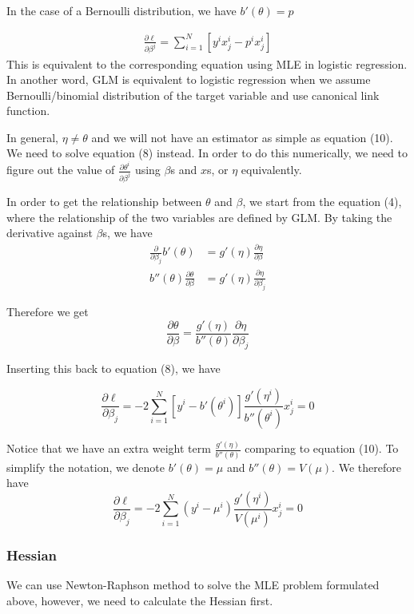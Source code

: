 \documentclass[12pt, oneside]{article}
\begin{document}
In the case of a Bernoulli distribution, we have $b'(\theta)=p$

\begin{align*}
\frac{\partial \ell}{\partial \beta^j}=\sum\limits_{i=1}^N[y^ix^i_j-p^ix^i_j]
\end{align*}
This is equivalent to the corresponding equation using MLE in logistic regression. In another word, GLM is equivalent to logistic regression when we assume Bernoulli/binomial distribution of the target variable and use canonical link function.

In general, $\eta\neq\theta$ and we will not have an estimator as simple as equation (10). We need to solve equation (8) instead. In order to do this numerically, we need to figure out the value of $\frac{\partial \theta^i}{\partial\beta^j}$ using $\beta$s and $x$s, or $\eta$ equivalently. 

In order to get the relationship between $\theta$ and $\beta$, we start from the equation (4), where the relationship of the two variables are defined by GLM. By taking the derivative against $\beta$s, we have 
\begin{align}
\frac{\partial}{\partial\beta_j}b'(\theta)&=g'(\eta)\frac{\partial \eta}{\partial \beta}\\
b''(\theta)\frac{\partial \theta}{\partial\beta}&=g'(\eta)\frac{\partial \eta}{\partial \beta_j}
\end{align}

Therefore we get 
\begin{equation}
\frac{\partial \theta}{\partial\beta}=\frac{g'(\eta)}{b''(\theta)}\frac{\partial \eta}{\partial \beta_j}
\end{equation}

Inserting this back to equation (8), we have 

\begin{equation}
\frac{\partial \ell}{\partial \beta_j}=-2\sum_{i=1}^{N}\left[y^i-b'(\theta^i)\right]\frac{g'(\eta^i)}{b''(\theta^i)}x^i_j=0
\end{equation}

Notice that we have an extra weight term $\frac{g'(\eta)}{b''(\theta)}$ comparing to equation (10). To simplify the notation, we denote $b'(\theta)=\mu$ and $b''(\theta)=V(\mu)$. We therefore have 
\begin{equation}
\frac{\partial \ell}{\partial \beta_j}=-2\sum_{i=1}^{N}(y^i-\mu^i)\frac{g'(\eta^i)}{V(\mu^i)}x^i_j=0
\end{equation}
\subsubsection{Hessian}
We can use Newton-Raphson method to solve the MLE problem formulated above, however, we need to calculate the Hessian first. 
\end{document}
